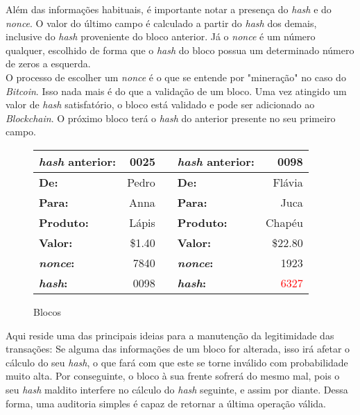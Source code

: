 	Além das informações habituais, é importante notar a presença do \textit{hash} e do \textit{nonce}. O valor do último campo é calculado a partir do \textit{hash} dos demais, inclusive do \textit{hash} proveniente do bloco anterior. Já o \textit{nonce} é um número qualquer, escolhido de forma que o \textit{hash} do bloco possua um determinado número de zeros a esquerda.\\
	
	O processo de escolher um \textit{nonce} é o que se entende por "mineração" no caso do \textit{Bitcoin}. Isso nada mais é do que a validação de um bloco. Uma vez atingido um valor de \textit{hash} satisfatório, o bloco está validado e pode ser adicionado ao \textit{Blockchain}. O próximo bloco terá o \textit{hash} do anterior presente no seu primeiro campo.\\
	
	\begin{figure}[H]
		\centering
		\begin{tabular}{|lr|c|lr|}
		\hline
		\textbf{\textit{hash} anterior:} & 0025 &\hspace*{1cm}& \textbf{\textit{hash} anterior:} & 0098\\
		\hline
		\textbf{De:} & Pedro & & \textbf{De:} & Flávia \\
		\hline
		\textbf{Para:} & Anna & & \textbf{Para:} & Juca \\
		\hline
		\textbf{Produto:} & Lápis & & \textbf{Produto:} & Chapéu \\
		\hline	
		\textbf{Valor:} & \$1.40 & & \textbf{Valor:} & \$22.80\\
		\hline
		\textbf{\textit{nonce}:} & 7840 & & \textbf{\textit{nonce}:} & 1923 \\
		\hline
		\textbf{\textit{hash}:} & 0098 & & \textbf{\textit{hash}:} & \textcolor{red}{6327} \\
		\hline
		\end{tabular}
		\label{fig:blockchain2}
		\caption{Blocos}
	\end{figure}	
	
	Aqui reside uma das principais ideias para a manutenção da legitimidade das transações: Se alguma das informações de um bloco for alterada, isso irá afetar o cálculo do seu \textit{hash}, o que fará com que este se torne inválido com probabilidade muito alta. Por conseguinte, o bloco à sua frente sofrerá do mesmo mal, pois o seu \textit{hash} maldito interfere no cálculo do \textit{hash} seguinte, e assim por diante. Dessa forma, uma auditoria simples é capaz de retornar a última operação válida.
	
